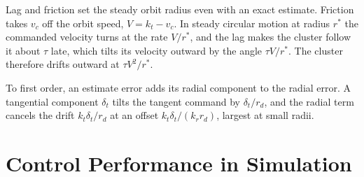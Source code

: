 \documentclass[lettersize,journal]{IEEEtran}
\newcommand{\rev}[1]{#1}                             %
\begin{document}
Lag and friction set the steady orbit radius even with an exact estimate. Friction takes $v_c$ off the orbit speed, $V = k_t - v_c$. In steady circular motion at radius $r^*$ the commanded velocity turns at the rate $V/r^*$, and the lag makes the cluster follow it about $\tau$ late, which tilts its velocity outward by the angle $\tau V/r^*$. The cluster therefore drifts outward at $\tau V^2/r^*$.

To first order, an estimate error adds its radial component to the radial error. A tangential component $\delta_t$ tilts the tangent command by $\delta_t/r_d$, and the radial term cancels the drift $k_t\delta_t/r_d$ at an offset $k_t\delta_t/(k_r r_d)$, largest at small radii.


\section{Control Performance in Simulation}
\providecommand{\newnum}[1]{\textcolor{blue}{#1}}
\end{document}
